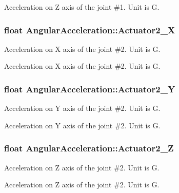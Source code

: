 Acceleration on Z axis of the joint \#1. Unit is G. 
\subsubsection[{\texorpdfstring{Actuator2\+\_\+X}{Actuator2_X}}]{\setlength{\rightskip}{0pt plus 5cm}float Angular\+Acceleration\+::\+Actuator2\+\_\+X}\hypertarget{struct_angular_acceleration_a203e9902f7e841db9df92d96082dbde7}{}\label{struct_angular_acceleration_a203e9902f7e841db9df92d96082dbde7}


Acceleration on X axis of the joint \#2. Unit is G. 

Acceleration on X axis of the joint \#2. Unit is G. 
\subsubsection[{\texorpdfstring{Actuator2\+\_\+Y}{Actuator2_Y}}]{\setlength{\rightskip}{0pt plus 5cm}float Angular\+Acceleration\+::\+Actuator2\+\_\+Y}\hypertarget{struct_angular_acceleration_a64c0708882b11a7e05d8c893bea8f8e1}{}\label{struct_angular_acceleration_a64c0708882b11a7e05d8c893bea8f8e1}


Acceleration on Y axis of the joint \#2. Unit is G. 

Acceleration on Y axis of the joint \#2. Unit is G. 
\subsubsection[{\texorpdfstring{Actuator2\+\_\+Z}{Actuator2_Z}}]{\setlength{\rightskip}{0pt plus 5cm}float Angular\+Acceleration\+::\+Actuator2\+\_\+Z}\hypertarget{struct_angular_acceleration_a617d68c9abfc43629b2293e27370b539}{}\label{struct_angular_acceleration_a617d68c9abfc43629b2293e27370b539}


Acceleration on Z axis of the joint \#2. Unit is G. 

Acceleration on Z axis of the joint \#2. Unit is G. 

